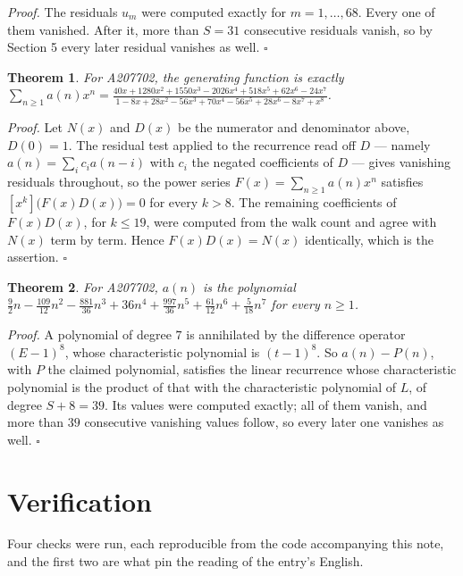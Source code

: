 \documentclass[11pt]{article}
\newtheorem{theorem}{Theorem}
\theoremstyle{definition}
\begin{document}
{\itshape Proof.} The residuals $u_m$ were computed exactly for $m = 1,\dots,68$. Every one of them vanished. After it, more than $S = 31$ consecutive residuals vanish, so by Section 5 every later residual vanishes as well. $\square$

\begin{theorem} For A207702, the generating function is exactly $\sum_{n\ge 1} a(n)x^n = \frac{40x + 1280x^{2} + 1550x^{3} - 2026x^{4} + 518x^{5} + 62x^{6} - 24x^{7}}{1 - 8x + 28x^{2} - 56x^{3} + 70x^{4} - 56x^{5} + 28x^{6} - 8x^{7} + x^{8}}$.\end{theorem}

{\itshape Proof.} Let $N(x)$ and $D(x)$ be the numerator and denominator above, $D(0)=1$. The residual test applied to the recurrence read off $D$ --- namely $a(n) = \sum_i c_i a(n-i)$ with $c_i$ the negated coefficients of $D$ --- gives vanishing residuals throughout, so the power series $F(x)=\sum_{n\ge 1}a(n)x^n$ satisfies $[x^k]\bigl(F(x)D(x)\bigr) = 0$ for every $k > 8$. The remaining coefficients of $F(x)D(x)$, for $k \le 19$, were computed from the walk count and agree with $N(x)$ term by term. Hence $F(x)D(x) = N(x)$ identically, which is the assertion. $\square$

\begin{theorem} For A207702, $a(n)$ is the polynomial $\frac{9}{2}n - \frac{109}{12}n^{2} - \frac{881}{36}n^{3} + 36n^{4} + \frac{997}{36}n^{5} + \frac{61}{12}n^{6} + \frac{5}{18}n^{7}$ for every $n \ge 1$.\end{theorem}

{\itshape Proof.} A polynomial of degree $7$ is annihilated by the difference operator $(E-1)^{8}$, whose characteristic polynomial is $(t-1)^{8}$. So $a(n) - P(n)$, with $P$ the claimed polynomial, satisfies the linear recurrence whose characteristic polynomial is the product of that with the characteristic polynomial of $L$, of degree $S + 8 = 39$. Its values were computed exactly; all of them vanish, and more than $39$ consecutive vanishing values follow, so every later one vanishes as well. $\square$

\section{Verification}

Four checks were run, each reproducible from the code accompanying this note, and the first two are what pin the reading of the entry's English.
\end{document}
